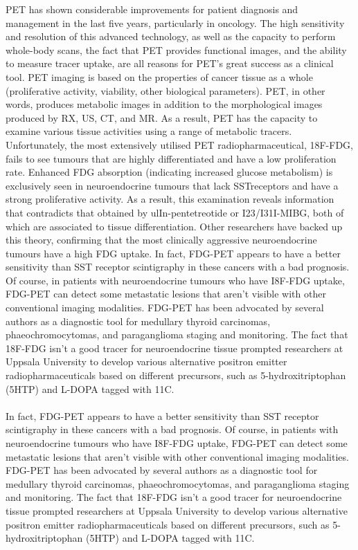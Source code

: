\documentclass{article}
\begin{document}
\begin{multicols}{2}
PET has shown considerable improvements for patient diagnosis and management in the last five years, particularly in oncology. The high sensitivity and resolution of this advanced technology, as well as the capacity to perform whole-body scans, the fact that PET provides functional images, and the ability to measure tracer uptake, are all reasons for PET's great success as a clinical tool. PET imaging is based on the properties of cancer tissue as a whole (proliferative activity, viability, other biological parameters). PET, in other words, produces metabolic images in addition to the morphological images produced by RX, US, CT, and MR. As a result, PET has the capacity to examine various tissue activities using a range of metabolic tracers. Unfortunately, the most extensively utilised PET radiopharmaceutical, 18F-FDG, fails to see tumours that are highly differentiated and have a low proliferation rate. Enhanced FDG absorption (indicating increased glucose metabolism) is exclusively seen in neuroendocrine tumours that lack SSTreceptors and have a strong proliferative activity. As a result, this examination reveals information that contradicts that obtained by ulIn-pentetreotide or I23/I31I-MIBG, both of which are associated to tissue differentiation. Other researchers have backed up this theory, confirming that the most clinically aggressive neuroendocrine tumours have a high FDG uptake\cite{mcewan1985radio}. In fact, FDG-PET appears to have a better sensitivity than SST receptor scintigraphy in these cancers with a bad prognosis. Of course, in patients with neuroendocrine tumours who have I8F-FDG uptake, FDG-PET can detect some metastatic lesions that aren't visible with other conventional imaging modalities. FDG-PET has been advocated by several authors as a diagnostic tool for medullary thyroid carcinomas, phaeochromocytomas, and paraganglioma staging and monitoring. The fact that 18F-FDG isn't a good tracer for neuroendocrine tissue prompted researchers at Uppsala University to develop various alternative positron emitter radiopharmaceuticals based on different precursors, such as 5-hydroxitriptophan (5HTP) and L-DOPA tagged with 11C\cite{short1967sympathetic}.\\ \\ 

In fact, FDG-PET appears to have a better sensitivity than SST receptor scintigraphy in these cancers with a bad prognosis. Of course, in patients with neuroendocrine tumours who have I8F-FDG uptake, FDG-PET can detect some metastatic lesions that aren't visible with other conventional imaging modalities. FDG-PET has been advocated by several authors as a diagnostic tool for medullary thyroid carcinomas, phaeochromocytomas, and paraganglioma staging and monitoring. The fact that 18F-FDG isn't a good tracer for neuroendocrine tissue prompted researchers at Uppsala University to develop various alternative positron emitter radiopharmaceuticals based on different precursors, such as 5-hydroxitriptophan (5HTP) and L-DOPA tagged with 11C.


\end{multicols}
\end{document}
